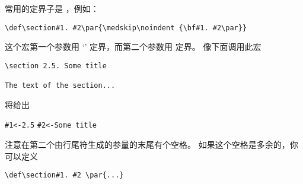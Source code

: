 \documentclass{book}
\begin{document}
常用的定界子是 ，例如：
\begin{verbatim}
\def\section#1. #2\par{\medskip\noindent {\bf#1. #2\par}}
\end{verbatim}
这个宏第一个参数用 `' 定界，而第二个参数用  定界。
像下面调用此宏
\begin{verbatim}
\section 2.5. Some title

The text of the section...
\end{verbatim}
将给出
\begin{disp}\verb>#1<-2.5>\nl
\verb>#2<-Some title>\end{disp}
注意在第二个由行尾符生成的参量的末尾有个空格。
如果这个空格是多余的，你可以定义
\begin{verbatim}
\def\section#1. #2 \par{...}
\end{verbatim}
\end{document}
